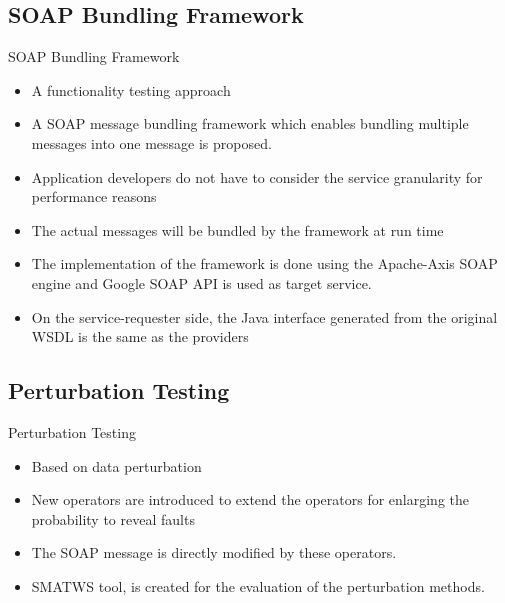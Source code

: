 \documentclass{beamer}
\begin{document}
\subsection{SOAP Bundling Framework}
\begin{frame}{SOAP Bundling Framework}
	\begin{itemize}
		\item A functionality testing approach
		\item A SOAP message bundling framework which enables bundling multiple messages into one message is proposed.
		\item Application developers do not have to consider the service
		granularity for performance reasons
		\item The actual messages will be bundled
		by the framework at run time
		\item The implementation of the framework is done using the Apache-Axis SOAP engine and Google SOAP API is used as target service.
		\item On the service-requester side, the Java interface generated from the original WSDL is the same as the providers
	\end{itemize}
\end{frame}

\subsection{Perturbation Testing}
\begin{frame}{Perturbation Testing}
	\begin{itemize}
		\item Based on data perturbation
		\item New operators are introduced to extend the operators for enlarging the probability to reveal faults
		\item The SOAP message is directly modified by these operators.
		\item SMATWS tool, is created for the evaluation of the perturbation methods.
	\end{itemize}
\end{frame}
\end{document}

